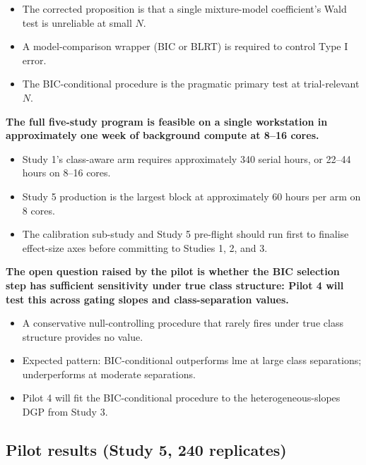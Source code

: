 \documentclass[
  11pt,
]{article}
\begin{document}
\begin{itemize}\setlength{\itemsep}{2pt}\setlength{\parskip}{0pt}
\item The corrected proposition is that a single mixture-model
  coefficient's Wald test is unreliable at small $N$.
\item A model-comparison wrapper (BIC or BLRT) is required to control
  Type I error.
\item The BIC-conditional procedure is the pragmatic primary test at
  trial-relevant $N$.
\end{itemize}

\textbf{The full five-study program is feasible on a single
workstation in approximately one week of background compute at 8--16
cores.}

\begin{itemize}\setlength{\itemsep}{2pt}\setlength{\parskip}{0pt}
\item Study 1's class-aware arm requires approximately 340 serial
  hours, or 22--44 hours on 8--16 cores.
\item Study 5 production is the largest block at approximately 60
  hours per arm on 8 cores.
\item The calibration sub-study and Study 5 pre-flight should run
  first to finalise effect-size axes before committing to Studies
  1, 2, and 3.
\end{itemize}

\textbf{The open question raised by the pilot is whether the BIC
selection step has sufficient sensitivity under true class structure:
Pilot 4 will test this across gating slopes and class-separation
values.}

\begin{itemize}\setlength{\itemsep}{2pt}\setlength{\parskip}{0pt}
\item A conservative null-controlling procedure that rarely fires
  under true class structure provides no value.
\item Expected pattern: BIC-conditional outperforms lme at large
  class separations; underperforms at moderate separations.
\item Pilot 4 will fit the BIC-conditional procedure to the
  heterogeneous-slopes DGP from Study 3.
\end{itemize}

\subsection{Pilot results (Study 5, 240 replicates)}\label{pilot-results-study-5-240-replicates}
\end{document}
